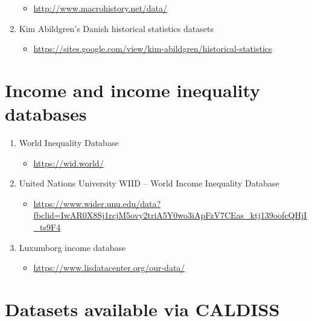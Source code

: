 \documentclass[
]{book}
\providecommand{\tightlist}{%
  \setlength{\itemsep}{0pt}\setlength{\parskip}{0pt}}
\begin{document}
\begin{enumerate}
  \begin{itemize}
  \tightlist
  \item
    \url{http://www.macrohistory.net/data/}
  \end{itemize}
\item
  Kim Abildgren's Danish historical statistics datasets

  \begin{itemize}
  \tightlist
  \item
    \url{https://sites.google.com/view/kim-abildgren/historical-statistics}
  \end{itemize}
\end{enumerate}

\hypertarget{income-and-income-inequality-databases}{%
\section{Income and income inequality databases}\label{income-and-income-inequality-databases}}

\begin{enumerate}
\def\labelenumi{\arabic{enumi}.}
\tightlist
\item
  World Inequality Database

  \begin{itemize}
  \tightlist
  \item
    \url{https://wid.world/}
  \end{itemize}
\item
  United Nations University WIID -- World Income Inequality Database

  \begin{itemize}
  \tightlist
  \item
    \url{https://www.wider.unu.edu/data?fbclid=IwAR0X8Sj1rcjM5ovy2triA5Y0wo3iApFzV7CEas_ktj139oofcQHjI_ts9F4}
  \end{itemize}
\item
  Luxumborg income database

  \begin{itemize}
  \tightlist
  \item
    \url{https://www.lisdatacenter.org/our-data/}
  \end{itemize}
\end{enumerate}

\hypertarget{datasets-available-via-caldiss}{%
\section{Datasets available via CALDISS}\label{datasets-available-via-caldiss}}
\end{document}

